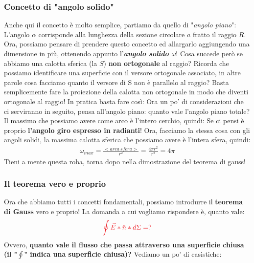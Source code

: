         \subsubsection{Concetto di "angolo solido"}
            Anche qui il concetto è molto semplice, partiamo da quello di "\textit{angolo piano}":
            L'angolo $\alpha$ corrisponde alla lunghezza della sezione circolare $a$ fratto il raggio $R$. Ora, possiamo pensare di prendere questo concetto ed allargarlo aggiungendo una dimensione in più, ottenendo appunto l'\textit{\textbf{angolo solido $\omega$}}!
            Cosa succede però se abbiamo una calotta sferica (la $S$) \textbf{non ortogonale} al raggio? Ricorda che possiamo identificare una superficie con il versore ortogonale associato, in altre parole cosa facciamo quanto il versore di S non è parallelo al raggio? Basta semplicemente fare la proiezione della calotta non ortogonale in modo che diventi ortogonale al raggio! In pratica basta fare così:
            Ora un po' di considerazioni che ci serviranno in seguito, pensa all'angolo piano: quanto vale l'angolo piano totale? Il massimo che possiamo avere come arco è l'intero cerchio, quindi:
            Se ci pensi è proprio \textbf{l'angolo giro espresso in radianti}! Ora, facciamo la stessa cosa con gli angoli solidi, la massima calotta sferica che possiamo avere è l'intera sfera, quindi:
            \begin{align*}
                \omega_{max}=\frac{<area\ sfera>}{r^2}=\frac{4\pi r^2}{r^2}=4\pi
            \end{align*}
            Tieni a mente questa roba, torna dopo nella dimostrazione del teorema di gauss!
        
        \subsubsection{Il teorema vero e proprio}
            Ora che abbiamo tutti i concetti fondamentali, possiamo introdurre il \textbf{teorema di Gauss} vero e proprio! La domanda a cui vogliamo rispondere è, quanto vale:
            \begin{align*}
                \textcolor{Red}{\oint \vec{E}*\hat{n}*d\Sigma = ?}
            \end{align*}
            Ovvero, \textbf{quanto vale il flusso che passa attraverso una superficie chiusa \textnormal{(il "$\oint$" indica una superficie chiusa)}?}
            Vediamo un po' di casistiche:

